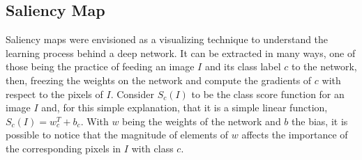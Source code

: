 \documentclass[conference]{IEEEtran}
\begin{document}
\subsection{Saliency Map}
\label{sec:saliency}

Saliency maps were envisioned as a visualizing technique to understand the learning process behind a deep network. It can be extracted in many ways, one of those being the practice of feeding an image $I$ and its class label $c$ to the network, then, freezing the weights on the network and compute the gradients of $c$ with respect to the pixels of $I$. Consider $S_c(I)$ to be the class score function for an image $I$ and, for this simple explanation, that it is a simple linear function, $S_c(I) = w_c^{T} + b_c$. With $w$ being the weights of the network and $b$ the bias, it is possible to notice that the magnitude of elements of $w$ affects the importance of the corresponding pixels in $I$ with class $c$.
\end{document}
